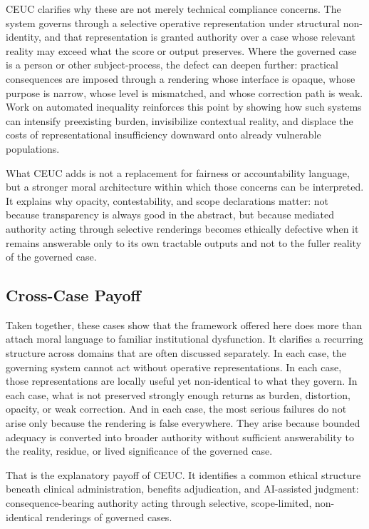 \documentclass[11pt]{article}
\begin{document}
CEUC clarifies why these are not merely technical compliance concerns. The system governs through a selective operative representation under structural non-identity, and that representation is granted authority over a case whose relevant reality may exceed what the score or output preserves. Where the governed case is a person or other subject-process, the defect can deepen further: practical consequences are imposed through a rendering whose interface is opaque, whose purpose is narrow, whose level is mismatched, and whose correction path is weak. Work on automated inequality reinforces this point by showing how such systems can intensify preexisting burden, invisibilize contextual reality, and displace the costs of representational insufficiency downward onto already vulnerable populations. \cite{Eubanks2018AutomatingInequality}

What CEUC adds is not a replacement for fairness or accountability language, but a stronger moral architecture within which those concerns can be interpreted. It explains why opacity, contestability, and scope declarations matter: not because transparency is always good in the abstract, but because mediated authority acting through selective renderings becomes ethically defective when it remains answerable only to its own tractable outputs and not to the fuller reality of the governed case.

\subsection{Cross-Case Payoff}

Taken together, these cases show that the framework offered here does more than attach moral language to familiar institutional dysfunction. It clarifies a recurring structure across domains that are often discussed separately. In each case, the governing system cannot act without operative representations. In each case, those representations are locally useful yet non-identical to what they govern. In each case, what is not preserved strongly enough returns as burden, distortion, opacity, or weak correction. And in each case, the most serious failures do not arise only because the rendering is false everywhere. They arise because bounded adequacy is converted into broader authority without sufficient answerability to the reality, residue, or lived significance of the governed case.

That is the explanatory payoff of CEUC. It identifies a common ethical structure beneath clinical administration, benefits adjudication, and AI-assisted judgment: consequence-bearing authority acting through selective, scope-limited, non-identical renderings of governed cases.
\end{document}
